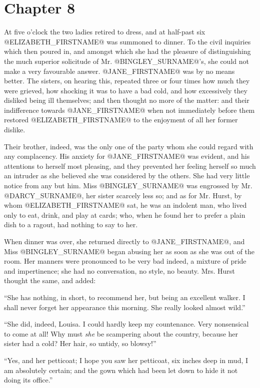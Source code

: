 \chapter*{Chapter 8}


At five o'clock the two ladies retired to dress, and at half-past six
@ELIZABETH_FIRSTNAME@ was summoned to dinner. To the civil inquiries which then
poured in, and amongst which she had the pleasure of distinguishing the
much superior solicitude of Mr. @BINGLEY_SURNAME@'s, she could not make a very
favourable answer. @JANE_FIRSTNAME@ was by no means better. The sisters, on hearing
this, repeated three or four times how much they were grieved, how
shocking it was to have a bad cold, and how excessively they disliked
being ill themselves; and then thought no more of the matter: and their
indifference towards @JANE_FIRSTNAME@ when not immediately before them restored
@ELIZABETH_FIRSTNAME@ to the enjoyment of all her former dislike.

Their brother, indeed, was the only one of the party whom she could
regard with any complacency. His anxiety for @JANE_FIRSTNAME@ was evident, and his
attentions to herself most pleasing, and they prevented her feeling
herself so much an intruder as she believed she was considered by the
others. She had very little notice from any but him. Miss @BINGLEY_SURNAME@ was
engrossed by Mr. @DARCY_SURNAME@, her sister scarcely less so; and as for Mr.
Hurst, by whom @ELIZABETH_FIRSTNAME@ sat, he was an indolent man, who lived only to
eat, drink, and play at cards; who, when he found her to prefer a plain
dish to a ragout, had nothing to say to her.

When dinner was over, she returned directly to @JANE_FIRSTNAME@, and Miss @BINGLEY_SURNAME@
began abusing her as soon as she was out of the room. Her manners were
pronounced to be very bad indeed, a mixture of pride and impertinence;
she had no conversation, no style, no beauty. Mrs. Hurst thought the
same, and added:

``She has nothing, in short, to recommend her, but being an excellent
walker. I shall never forget her appearance this morning. She really
looked almost wild.''

``She did, indeed, Louisa. I could hardly keep my countenance. Very
nonsensical to come at all! Why must \textit{she} be scampering about the
country, because her sister had a cold? Her hair, so untidy, so blowsy!''

``Yes, and her petticoat; I hope you saw her petticoat, six inches deep
in mud, I am absolutely certain; and the gown which had been let down to
hide it not doing its office.''

